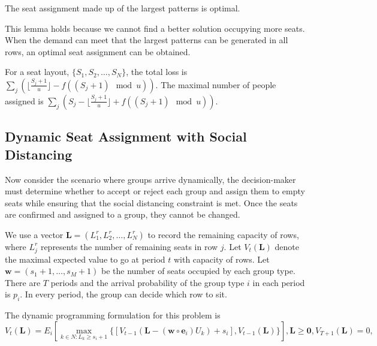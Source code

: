 \begin{lem}
The seat assignment made up of the largest patterns is optimal.
\end{lem}

This lemma holds because we cannot find a better solution occupying more seats. When the demand can meet that the largest patterns can be generated in all rows, an optimal seat assignment can be obtained.

\begin{prop}
For a seat layout, $\{S_1, S_2, \ldots, S_{N}\}$, the total loss is $\sum_{j} (\lfloor \frac{S_j+1}{u}  \rfloor - f((S_j +1)\mod u))$. The maximal number of people assigned is $\sum_{j} (S_j - \lfloor \frac{S_j+1}{u} \rfloor + f((S_j +1)\mod u))$.
\end{prop}

\subsection{Dynamic Seat Assignment with Social Distancing}


Now consider the scenario where groups arrive dynamically, the decision-maker must determine whether to accept or reject each group and assign them to empty seats while ensuring that the social distancing constraint is met. Once the seats are confirmed and assigned to a group, they cannot be changed.

We use a vector $\mathbf{L}= (L^{r}_1, L^{r}_2, \ldots, L^{r}_{N})$ to record the remaining capacity of rows, where $L^{r}_{j}$ represents the number of remaining seats in row $j$. Let $V_{t}(\mathbf{L})$ denote the maximal expected value to go at period $t$ with capacity of rows. Let $\mathbf{w} = (s_1+1, \ldots, s_{M}+1)$ be the number of seats occupied by each group type. There are $T$ periods and the arrival probability of the group type $i$ in each period is $p_i$. In every period, the group can decide which row to sit.

The dynamic programming formulation for this problem is
$$V_{t}(\mathbf{L}) = E_{i} \left[ \max_{k \in N: L_k \geq s_i +1} \{ {[V_{t-1}(\mathbf{L}- (\mathbf{w} \circ \mathbf{e}_{i})U_{k})+ s_i]}, {V_{t-1}(\mathbf{L})}\} \right], \mathbf{L} \geq \mathbf{0}, V_{T+1}(\mathbf{L}) = 0,$$

